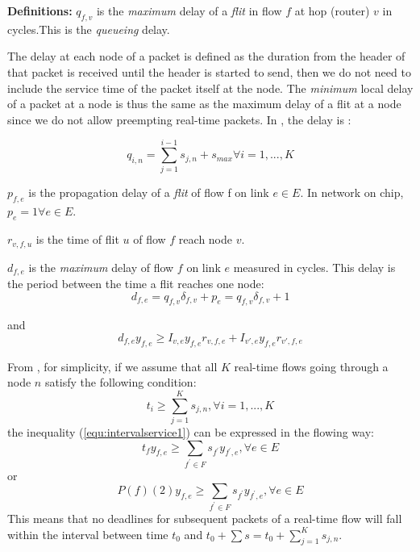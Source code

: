\documentclass[a4]{article}
\begin{document}
{\textbf{Definitions:}}
$q_{f,v}$ is the {\em maximum} delay of a {\em flit} in flow $f$ at
hop (router) $v$ in cycles.This is the {\em queueing} delay.

The delay at each node of a packet is defined as the duration from the header
of that  packet is received until the header is started to send, then we do not
need to include the service time of the packet itself at the node. The {\em
minimum} local delay of a packet at a node is thus the same as the maximum
delay of a flit at a node since we do not allow preempting real-time packets. In
\cite{Ferrari90ascheme}, the delay is :

\begin{equation}\label{equ:nodedelay1}
q_{i,n} = \sum_{j=1}^{i-1}s_{j,n}+s_{max} \forall i = 1, ..., K
\end{equation}

 
$p_{f,e}$ is the propagation delay of a {\em flit} of flow f on link $e
\in E$. In network on chip, $p_e=1 \forall e \in E$.

$r_{v,f,u}$ is the time of flit $u$ of flow $f$ reach node $v$.  

$d_{f,e}$ is the {\em maximum} delay of flow $f$ on link $e$ measured in
cycles. This delay is the period between the time a flit reaches one node:
\begin{equation}\label{equ:edgeDelay}
d_{f,e} = q_{f,v}\delta_{f,v} + p_{e} = q_{f,v}\delta_{f,v} + 1 
\end{equation}

and
\begin{equation} 
d_{f,e}y_{f,e} \geq I_{v,e}y_{f,e}r_{v,f,e} + I_{v',e}y_{f,e}r_{v',f,e}
\end{equation}

From \cite{Ferrari90ascheme}, for simplicity, if we assume that all $K$ 
real-time flows going through a node $n$ satisfy the following condition:
\begin{equation}\label{equ:intervalservice1}
t_i \geq \sum_{j=1}^Ks_{j,n}, \forall i = 1,...,K
\end{equation}
the inequality (\ref{equ:intervalservice1}) can be expressed in the flowing way:
\begin{equation}
t_f y_{f,e}\geq \sum_{f^{'} \in F} s_{f^{'}}y_{f^{'},e}, \forall e \in E
\end{equation}
or
\begin{equation}\label{equ:intervalservice3}
P(f)(2) y_{f,e}\geq \sum_{f^{'} \in F} s_{f^{'}}y_{f^{'},e}, \forall e \in E
\end{equation}
This means that no deadlines for subsequent packets of a real-time flow will fall within the interval 
between time $t_0$ and $t_0 + \sum s = t_0 + \sum_{j=1}^Ks_{j,n}$. 
\end{document}
